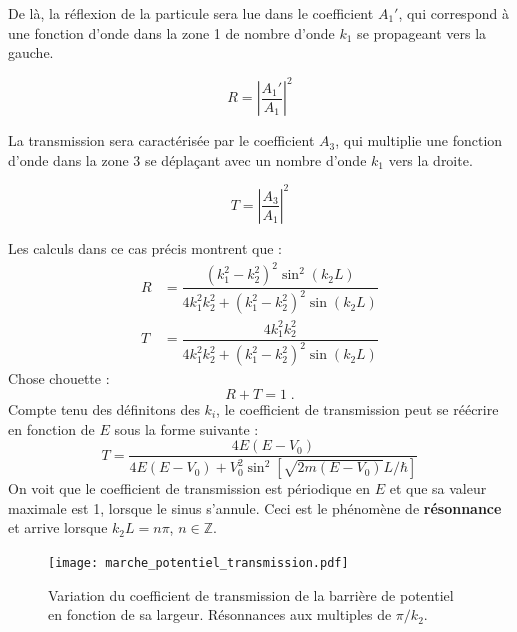 \documentclass[12pt, a4paper]{book}
\begin{document}
De là, la réflexion de la particule sera lue dans le coefficient $A_1'$, qui correspond à une fonction d'onde dans la zone 1 de nombre d'onde $k_1$ se propageant vers la gauche.

$$ R = \left|\dfrac{A_1'}{A_1}\right|^2$$

La transmission sera caractérisée par le coefficient $A_3$, qui multiplie une fonction d'onde dans la zone 3 se déplaçant avec un nombre d'onde $k_1$ vers la droite.

$$ T = \left|\dfrac{A_3}{A_1}\right|^2$$

Les calculs dans ce cas précis montrent que :
\begin{align}
  R &= \dfrac{(k_1 ^2 - k_2 ^ 2) ^2 \sin^2(k_2 L)}{4k_1 ^2 k_2 ^2 + (k_1 ^2 - k_2 ^ 2) ^2\sin(k_2L)} \\
  T &= \dfrac{4k_1 ^2 k_2 ^2}{4k_1 ^2 k_2 ^2 + (k_1 ^2 - k_2 ^ 2) ^2\sin(k_2L)} 
\end{align}
Chose chouette : 
$$ R + T = 1 \; .$$
Compte tenu des définitons des $k_i$, le coefficient de transmission peut se réécrire en fonction de $E$ sous la forme suivante :
\begin{equation}
  T = \dfrac{4E (E-V_0)}{4E(E-V_0) + V_0 ^2 \sin ^ 2\left[\sqrt{2m(E-V_0)} L/\hbar\right]}
\end{equation}
On voit que le coefficient de transmission est périodique en $E$ et que sa valeur maximale est 1, lorsque le sinus s'annule. Ceci est le phénomène de \textbf{résonnance} et arrive lorsque $k_2L = n\pi$, $n\in \mathbb{Z}$.

\begin{figure}[h]
  \centering
  \texttt{[image: marche\_potentiel\_transmission.pdf]}
  \caption{Variation du coefficient de transmission de la barrière de potentiel en fonction de sa largeur. Résonnances aux multiples de $\pi/k_2$.}
\end{figure}
\end{document}
